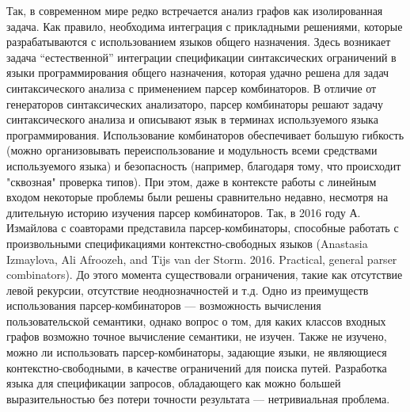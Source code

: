 \documentclass[12pt]{article}  %
\theoremstyle{remark}
\begin{document}
Так, в современном мире редко встречается анализ графов как изолированная задача.
Как правило, необходима интеграция с прикладными решениями, которые разрабатываются с использованием языков общего назначения.
Здесь возникает задача ``естественной'' интеграции спецификации синтаксических ограничений в языки программирования общего назначения, которая удачно решена для задач синтаксического анализа с применением парсер комбинаторов.
В отличие от генераторов синтаксических анализаторо, парсер комбинаторы решают задачу синтаксического анализа и описывают язык в терминах используемого языка программирования.
Использование комбинаторов обеспечивает большую гибкость (можно организовывать переиспользование и модульность всеми средствами используемого языка) и безопасность (например, благодаря тому, что происходит "сквозная" проверка типов).
При этом, даже в контексте работы с линейным входом некоторые проблемы были решены сравнительно недавно, несмотря на длительную историю изучения парсер комбинаторов.
Так, в 2016 году А. Измайлова с соавторами представила парсер-комбинаторы, способные работать с произвольными спецификациями контекстно-свободных языков (Anastasia Izmaylova, Ali Afroozeh, and Tijs van der Storm. 2016. Practical, general parser combinators).
До этого момента существовали ограничения, такие как отсутствие левой рекурсии, отсутствие неоднозначностей и т.д.
Одно из преимуществ использования парсер-комбинаторов --- возможность вычисления пользовательской семантики, однако вопрос о том, для каких классов входных графов возможно точное вычисление семантики, не изучен.
Также не изучено, можно ли использовать парсер-комбинаторы, задающие языки, не являющиеся контекстно-свободными, в качестве ограничений для поиска путей.
Разработка языка для спецификации запросов, обладающего как можно большей выразительностью без потери точности результата --- нетривиальная проблема.
\end{document}
